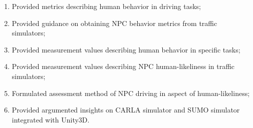 \documentclass{VUMIFPS-master-intro}
\begin{document}
%

\begin{enumerate}
	\item Provided metrics describing human behavior in driving tasks;
	\item Provided guidance on obtaining NPC behavior metrics from traffic simulators;
	\item Provided measurement values describing human behavior in specific tasks;
	\item Provided measurement values describing NPC human-likeliness in traffic simulators;
	\item Formulated assessment method of NPC driving in aspect of human-likeliness;
	\item Provided argumented insights on CARLA simulator and SUMO simulator integrated with Unity3D.
\end{enumerate}









\printbibliography[heading=bibintoc]




\end{document}
